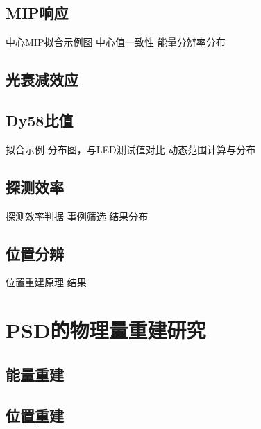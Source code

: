 \subsection{MIP响应}
中心MIP拟合示例图
中心值一致性
能量分辨率分布

\subsection{光衰减效应}

\subsection{Dy58比值}
拟合示例
分布图，与LED测试值对比
动态范围计算与分布

\subsection{探测效率}
探测效率判据
事例筛选
结果分布

\subsection{位置分辨}
位置重建原理
结果

\section{PSD的物理量重建研究}
\subsection{能量重建}
\subsection{位置重建}